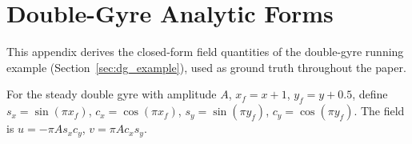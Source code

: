 \documentclass[lettersize,journal]{IEEEtran}
\begin{document}
\appendices

\section{Double-Gyre Analytic Forms}
\label{app:analytic}

This appendix derives the closed-form field quantities of the
double-gyre running example (Section~\ref{sec:dg_example}), used as
ground truth throughout the paper.

For the steady double gyre with amplitude $A$, $x_f = x + 1$,
$y_f = y + 0.5$, define $s_x = \sin(\pi x_f)$, $c_x = \cos(\pi x_f)$,
$s_y = \sin(\pi y_f)$, $c_y = \cos(\pi y_f)$. The field is
$u = -\pi A s_x c_y$, $v = \pi A c_x s_y$.
\end{document}
